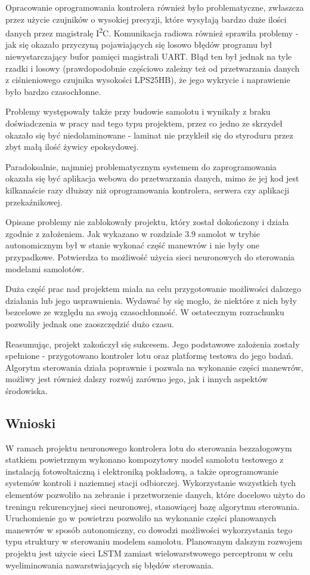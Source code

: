 \documentclass[12pt, a4paper]{article}
\begin{document}
Opracowanie oprogramowania kontrolera również było problematyczne, zwłaszcza przez użycie czujników o wysokiej precyzji, które wysyłają bardzo duże ilości danych przez magistralę I\textsuperscript{2}C. Komunikacja radiowa również sprawiła problemy - jak się okazało przyczyną pojawiających się losowo błędów programu był niewystarczający bufor pamięci magistrali UART. Błąd ten był jednak na tyle rzadki i losowy (prawdopodobnie częściowo zależny też od przetwarzania danych z ciśnieniowego czujnika wysokości LPS25HB), że jego wykrycie i naprawienie było bardzo czasochłonne.

Problemy występowały także przy budowie samolotu i wynikały z braku doświadczenia w pracy nad tego typu projektem, przez co jedno ze skrzydeł okazało się być niedolaminowane - laminat nie przykleił się do styroduru przez zbyt małą ilość żywicy epoksydowej.

Paradoksalnie, najmniej problematycznym systemem do zaprogramowania okazała się być aplikacja webowa do przetwarzania danych, mimo że jej kod jest kilkanaście razy dłuższy niż oprogramowania kontrolera, serwera czy aplikacji przekaźnikowej.

Opisane problemy nie zablokowały projektu, który został dokończony i działa zgodnie z założeniem. Jak wykazano w rozdziale 3.9 samolot w trybie autonomicznym był w stanie wykonać część manewrów i nie były one przypadkowe. Potwierdza to możliwość użycia sieci neuronowych do sterowania modelami samolotów. 

Duża część prac nad projektem miała na celu przygotowanie możliwości dalszego działania lub jego usprawnienia. Wydawać by się mogło, że niektóre z nich były bezcelowe ze względu na swoją czasochłonność. W ostatecznym rozrachunku pozwoliły jednak one zaoszczędzić dużo czasu.

Reasumując, projekt zakończył się sukcesem. Jego podstawowe założenia zostały spełnione -  przygotowano kontroler lotu oraz platformę testowa do jego badań. Algorytm sterowania działa poprawnie i pozwala na wykonanie części manewrów, możliwy jest również dalszy rozwój zarówno jego, jak i innych aspektów środowiska.

\subsection{Wnioski}
W ramach projektu neuronowego kontrolera lotu do sterowania bezzałogowym statkiem powietrznym wykonano kompozytowy model samolotu testowego z instalacją fotowoltaiczną i elektroniką pokładową, a także oprogramowanie systemów kontroli i naziemnej stacji odbiorczej. Wykorzystanie wszystkich tych elementów pozwoliło na zebranie i przetworzenie danych, które docelowo użyto do treningu rekurencyjnej sieci neuronowej, stanowiącej bazę algorytmu sterowania. Uruchomienie go w powietrzu pozwoliło na wykonanie części planowanych manewrów w sposób autonomiczny, co dowodzi możliwości wykorzystania tego typu struktury w sterowaniu modelem samolotu. Planowanym dalszym rozwojem projektu jest użycie sieci LSTM zamiast wielowarstwowego perceptronu w celu wyeliminowania nawarstwiających się błędów sterowania.
\end{document}
